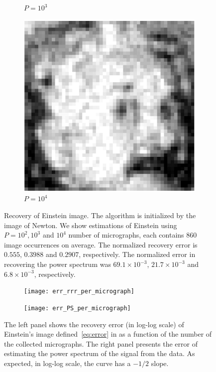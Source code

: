 \documentclass[english,11pt]{article}
\theoremstyle{plain}
\theoremstyle{definition}
\theoremstyle{remark}
\theoremstyle{plain}
\begin{document}
\begin{figure}[h!]
\begin{subfigure}[h]{0.25\textwidth}
		\caption{$P =10^3$}
	\end{subfigure}%
	\begin{subfigure}[h]{0.25\textwidth}
		\centering
		\includegraphics[scale=0.4]{Einstein_1e4}
		\caption{$P = 10^4$}
	\end{subfigure}%
	\caption{\label{fig:Einst_example} Recovery of Einstein image. The algorithm is initialized by the image of Newton. We show estimations of Einstein using $P=10^2,10^3$ and $10^4$ number of micrographs, each contains $860$ image occurrences on average. The normalized recovery error is $0.555$, $0.3988$ and $0.2907$, respectively. The normalized error in recovering the power spectrum was $69.1\times10^{-3} $, $21.7\times10^{-3} $ and $6.8\times10^{-3}$, respectively.}	
\end{figure}


\begin{figure}[h!]
	\centering
	\begin{subfigure}[h]{0.5\textwidth}
		\centering
	 \texttt{[image: err\_rrr\_per\_micrograph]}
    \caption{\label{fig:error_per_micro}}	
	\end{subfigure}%
	\begin{subfigure}[h]{0.5\textwidth}
		\centering
	 \texttt{[image: err\_PS\_per\_micrograph]}
\caption{}	
	\end{subfigure}%
	\caption{\label{fig:error_per_micro} The left panel shows the recovery error (in log-log scale) of Einstein's image defined~\eqref{eq:error} in as a function of the number of the collected micrographs. The right panel presents the error of estimating the power spectrum of the signal from the data. As expected, in log-log scale, the curve has a $-1/2$ slope.}	
\end{figure}










\appendix
\end{document}

